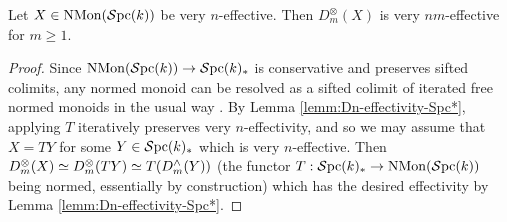 \documentclass{amsart}
\numberwithin{proposition}{section}
\numberwithin{equation}{section}
\def\NMon{\mathrm{NMon}}
\begin{document}
\begin{proposition} \label{prop:Dn-tens-eff}
Let $X \in \NMon(\Spc(k))$ be very $n$-effective.
Then $D_m^\otimes(X)$ is very $nm$-effective for $m \ge 1$.
\end{proposition}
\begin{proof}
Since $\NMon(\Spc(k)) \to \Spc(k)_*$ is conservative and preserves sifted colimits, any normed monoid can be resolved as a sifted colimit of iterated free normed monoids in the usual way \cite[Proposition~4.7.3.14]{lurie-ha}.
By Lemma \ref{lemm:Dn-effectivity-Spc*}, applying $T$ iteratively preserves very $n$-effectivity, and so we may assume that $X=TY$ for some $Y \in \mathcal{S}\mathrm{pc}{}(k)_*$ which is very $n$-effective.
Then $D_m^\otimes(X) \simeq D_m^\otimes(TY) \simeq T(D_m^\wedge(Y))$ (the functor $T: \Spc(k)_* \to \NMon(\Spc(k))$ being normed, essentially by construction) which has the desired effectivity by Lemma \ref{lemm:Dn-effectivity-Spc*}.
\end{proof}
\end{document}

